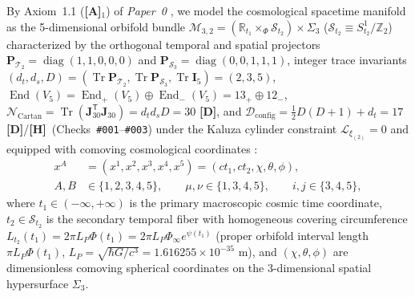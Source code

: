 \documentclass[11pt,a4paper]{article}
\newcommand{\catA}{\textbf{\textcolor{purple!80!black}{[A]}}}
\newcommand{\catD}{\textbf{\textcolor{blue!75!black}{[D]}}}
\newcommand{\catH}{\textbf{\textcolor{orange!85!black}{[H]}}}
\theoremstyle{plain}
\theoremstyle{definition}
\theoremstyle{remark}
\numberwithin{equation}{section}
\begin{document}
By Axiom~1.1 (\catA$_1$) of \textit{Paper~0} \cite{jimenez2026_p0}, we model the cosmological spacetime manifold as the 5-dimensional orbifold bundle $\mathcal{M}_{3,2} = (\mathbb{R}_{t_1} \times_{\Phi} \mathcal{S}_{t_2}) \times \Sigma_3$ ($\mathcal{S}_{t_2} \equiv S^1_{t_2}/\mathbb{Z}_2$) characterized by the orthogonal temporal and spatial projectors $\mathbf{P}_{\mathcal{T}_2} = \operatorname{diag}(1,1,0,0,0)$ and $\mathbf{P}_{\mathcal{S}_3} = \operatorname{diag}(0,0,1,1,1)$, integer trace invariants $(d_t, d_s, D) = (\operatorname{Tr}\mathbf{P}_{\mathcal{T}_2}, \operatorname{Tr}\mathbf{P}_{\mathcal{S}_3}, \operatorname{Tr}\mathbf{I}_5) = (2, 3, 5)$, $\operatorname{End}(V_5) = \operatorname{End}_+(V_5) \oplus \operatorname{End}_-(V_5) = 13_+ \oplus 12_-$, $\mathcal{N}_{\text{Cartan}} = \operatorname{Tr}(\mathbf{J}_{30}^{\mathsf{T}}\mathbf{J}_{30}) = d_t d_s D = 30$ \catD, and $\mathcal{D}_{\text{config}} = \frac{1}{2}D(D+1) + d_t = 17$ \catD/\catH\ (Checks~\texttt{\#001}--\texttt{\#003}) under the Kaluza cylinder constraint $\mathcal{L}_{\xi_{(2)}} = 0$ and equipped with comoving cosmological coordinates \cite{jimenez2026_p0,jimenez2026a,jimenez2026b}:
\begin{align}
x^A &= \left(x^1, x^2, x^3, x^4, x^5\right) = \left(c t_1, c t_2, \chi, \theta, \phi\right), \nonumber \\[3pt]
A,B &\in \{1,2,3,4,5\}, \qquad \mu,\nu \in \{1,3,4,5\}, \qquad i,j \in \{3,4,5\},
\label{eq:cosmo_5d_coordinates}
\end{align}
where $t_1 \in (-\infty, +\infty)$ is the primary macroscopic cosmic time coordinate, $t_2 \in \mathcal{S}_{t_2}$ is the secondary temporal fiber with homogeneous covering circumference $L_{t_2}(t_1) = 2\pi L_P \Phi(t_1) = 2\pi L_P \Phi_{\infty}e^{\psi(t_1)}$ (proper orbifold interval length $\pi L_P\Phi(t_1)$, $L_P = \sqrt{\hbar G / c^3} = 1.616255 \times 10^{-35}\text{ m}$), and $(\chi, \theta, \phi)$ are dimensionless comoving spherical coordinates on the 3-dimensional spatial hypersurface $\Sigma_3$.
\end{document}
